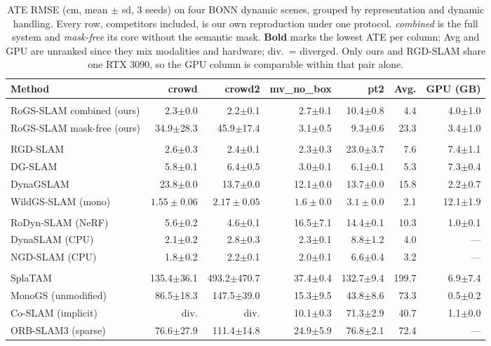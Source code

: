 \begin{table}[t]\centering\scriptsize\setlength{\tabcolsep}{2pt}
\begin{tabular}{>{\raggedright\arraybackslash}p{3.3cm}rrrrrr}\toprule
Method & crowd & crowd2 & mv\_no\_box & pt2 & Avg. & GPU (GB) \\ \midrule
\multicolumn{7}{l}{\emph{Ours, dynamic 3DGS}} \\
RoGS-SLAM combined (ours) & 2.3$\pm$0.0 & 2.2$\pm$0.1 & 2.7$\pm$0.1 & 10.4$\pm$0.8 & 4.4 & 4.0$\pm$1.0 \\
RoGS-SLAM mask-free (ours) & 34.9$\pm$28.3 & 45.9$\pm$17.4 & 3.1$\pm$0.5 & 9.3$\pm$0.6 & 23.3 & 3.4$\pm$1.0 \\
\midrule
\multicolumn{7}{l}{\emph{Dynamic 3DGS}} \\
RGD-SLAM & 2.6$\pm$0.3 & 2.4$\pm$0.1 & 2.3$\pm$0.3 & 23.0$\pm$3.7 & 7.6 & 7.4$\pm$1.1 \\
DG-SLAM & 5.8$\pm$0.1 & 6.4$\pm$0.5 & 3.0$\pm$0.1 & 6.1$\pm$0.1 & 5.3 & 7.3$\pm$0.4 \\
DynaGSLAM & 23.8$\pm$0.0 & 13.7$\pm$0.0 & 12.1$\pm$0.0 & 13.7$\pm$0.0 & 15.8 & 2.2$\pm$0.7 \\
WildGS-SLAM (mono) & {\boldmath$1.55\pm0.06$} & {\boldmath$2.17\pm0.05$} & {\boldmath$1.6\pm0.0$} & {\boldmath$3.1\pm0.0$} & 2.1 & 12.1$\pm$1.9 \\
\midrule
\multicolumn{7}{l}{\emph{Dynamic, non-3DGS}} \\
RoDyn-SLAM (NeRF) & 5.6$\pm$0.2 & 4.6$\pm$0.1 & 16.5$\pm$7.1 & 14.4$\pm$0.1 & 10.3 & 1.0$\pm$0.1 \\
DynaSLAM (CPU) & 2.1$\pm$0.2 & 2.8$\pm$0.3 & 2.3$\pm$0.1 & 8.8$\pm$1.2 & 4.0 & --- \\
NGD-SLAM (CPU) & 1.8$\pm$0.2 & 2.2$\pm$0.1 & 2.0$\pm$0.1 & 6.6$\pm$0.4 & 3.2 & --- \\
\midrule
\multicolumn{7}{l}{\emph{Static}} \\
SplaTAM & 135.4$\pm$36.1 & 493.2$\pm$470.7 & 37.4$\pm$0.4 & 132.7$\pm$9.4 & 199.7 & 6.9$\pm$7.4 \\
MonoGS (unmodified) & 86.5$\pm$18.3 & 147.5$\pm$39.0 & 15.3$\pm$9.5 & 43.8$\pm$8.6 & 73.3 & 0.5$\pm$0.2 \\
Co-SLAM (implicit) & div. & div. & 10.1$\pm$0.3 & 71.3$\pm$2.9 & 40.7 & 1.1$\pm$0.0 \\
ORB-SLAM3 (sparse) & 76.6$\pm$27.9 & 111.4$\pm$14.8 & 24.9$\pm$5.9 & 76.8$\pm$2.1 & 72.4 & --- \\
\bottomrule\end{tabular}
\caption{ATE RMSE (cm, mean $\pm$ sd, 3 seeds) on four BONN dynamic scenes, grouped by representation and dynamic handling. Every row, competitors included, is our own reproduction under one protocol. \emph{combined} is the full system and \emph{mask-free} its core without the semantic mask. \textbf{Bold} marks the lowest ATE per column; Avg and GPU are unranked since they mix modalities and hardware; div.\ = diverged. Only ours and RGD-SLAM share one RTX 3090, so the GPU column is comparable within that pair alone.}\end{table}


